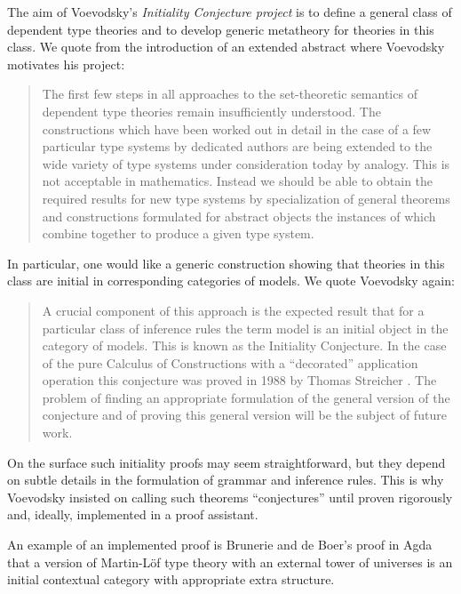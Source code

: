 \documentclass[11pt,a4paper]{article}
\theoremstyle{plain}
\theoremstyle{definition}
\begin{document}
The aim of Voevodsky's  {\em Initiality Conjecture project} is to define a general class of dependent type theories and to develop generic metatheory for theories in this class. We quote from the introduction of an extended abstract where Voevodsky \cite{voevodsky:initiality} motivates his project:
\begin{quotation}
The first few steps in all approaches to the set-theoretic semantics of dependent
type theories remain insuﬃciently understood. The constructions which have been
worked out in detail in the case of a few particular type systems by dedicated authors
are being extended to the wide variety of type systems under consideration today by
analogy. This is not acceptable in mathematics. Instead we should be able to obtain
the required results for new type systems by specialization of general theorems and
constructions formulated for abstract objects the instances of which combine together
to produce a given type system.
\end{quotation}
In particular, one would like a generic construction showing that theories in this class are initial in corresponding categories of models. We quote Voevodsky \cite{voevodsky:initiality} again:
\begin{quotation}
A crucial component of this approach is the expected result that for a particular
class of inference rules the term model is an initial object in the category of models.
This is known as the Initiality Conjecture. In the case of the pure Calculus of
Constructions with a “decorated” application operation this conjecture was proved in
1988 by Thomas Streicher \cite{streicher:thesis}. The problem of finding an appropriate formulation
of the general version of the conjecture and of proving this general version will be the
subject of future work.
\end{quotation}
On the surface such initiality proofs may seem straightforward, but they depend on subtle details in the formulation of grammar and inference rules. This is why Voevodsky insisted on calling such theorems ``conjectures'' until proven rigorously and, ideally, implemented in a proof assistant.

An example of an implemented proof is Brunerie and de Boer's \cite{Brunerie:initiality,deBoer:lic} proof in Agda that a version of Martin-Löf type theory with an external tower of universes is an initial contextual category \cite{cartmell:phd,cartmell:apal} with appropriate extra structure. %
\end{document}
